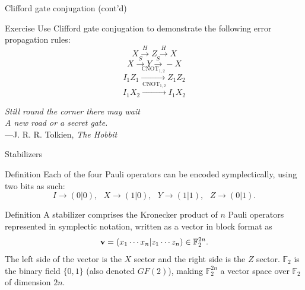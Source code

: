 \documentclass{beamer}
\newcommand{\F}{\mathbb F}
\newcommand{\CNOT}{\text{CNOT}}
\renewcommand{\vec}{\textbf}
\begin{document}
\begin{frame}{Clifford gate conjugation (cont'd)}
    \begin{block}{Exercise}
        Use Clifford gate conjugation to demonstrate the following error propagation rules:
        $$ X \xrightarrow{H} Z \xrightarrow{H} X $$
        $$ X \xrightarrow{S} Y \xrightarrow{S} -X $$
        $$ I_1Z_1 \xrightarrow{\CNOT_{1,2}} Z_1Z_2 $$
        $$ I_1X_2 \xrightarrow{\CNOT_{1,2}} I_1X_2$$
    \end{block}
    \begin{flushright}
        \textit{Still round the corner there may wait\\
        A new road or a secret gate.}\\---J. R. R. Tolkien, \textit{The Hobbit}
    \end{flushright}
\end{frame}




\begin{frame}{Stabilizers}
    \begin{block}{Definition}
        Each of the four Pauli operators can be encoded symplectically, using two bits as such:
        $$ I \to (0|0),\text{ } X\to (1|0), \text{ } Y\to(1|1), \text{ }Z\to(0|1). $$
    \end{block}
    \begin{block}{Definition}
        A stabilizer comprises the Kronecker product of $n$ Pauli operators represented in symplectic notation, written as a vector in block format as
        $$ \vec v = (x_1\cdots x_n | z_1 \cdots z_n) \in \F_2^{2n}.$$
        The left side of the vector is the $X$ sector and the right side is the $Z$ sector. $\F_2$ is the binary field $\{0,1\}$ (also denoted $GF(2)$), making $\F_2^{2n}$ a vector space over $\F_2$ of dimension $2n$.
    \end{block}

\end{frame}
\end{document}

